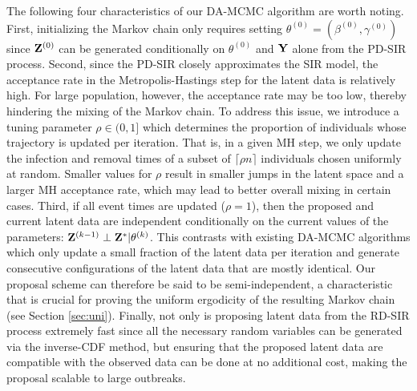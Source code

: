 \documentclass[11pt]{article}
\begin{document}
	The following four characteristics of our DA-MCMC algorithm are worth noting.
	First, initializing the Markov chain only requires setting $\theta^{(0)} = (\beta^{(0)}, \gamma^{(0)})$ since $\mathbf{Z}^{(0)}$ can be generated conditionally on $\theta^{(0)}$ and $\mathbf{Y}$ alone from the PD-SIR process.
	Second, since the PD-SIR closely approximates the SIR model, the acceptance rate in the Metropolis-Hastings step for the latent data is relatively high. For large population, however, the acceptance rate may be too low, thereby hindering the mixing of the Markov chain. To address this issue, we introduce a tuning parameter $\rho \in (0, 1]$ which determines the proportion of individuals whose trajectory is updated per iteration. That is, in a given MH step, we only update the infection and removal times of a subset of $\lceil\rho n\rceil$ individuals chosen uniformly at random.
	Smaller values for $\rho$ result in smaller jumps in the latent space and a larger MH acceptance rate, which may lead to better overall mixing in certain cases.
	Third, if all event times are updated ($\rho = 1$), then the proposed and current latent data are independent conditionally on the current values of the parameters: $\mathbf{Z}^{(k-1)} \perp \mathbf{Z}^* | \theta^{(k)}$. This contrasts with existing DA-MCMC algorithms which only update a small fraction of the latent data per iteration and generate consecutive configurations of the latent data that are mostly identical. 
	Our proposal scheme can therefore be said to be semi-independent, a characteristic that is crucial for proving the uniform ergodicity of the resulting Markov chain (see Section \ref{sec:uni}).
	Finally, not only is proposing latent data from the RD-SIR process extremely fast since all the necessary random variables can be generated via the inverse-CDF method, but ensuring that the proposed latent data are compatible with the observed data can be done at no additional cost, making the proposal scalable to large outbreaks.
	
\end{document}
